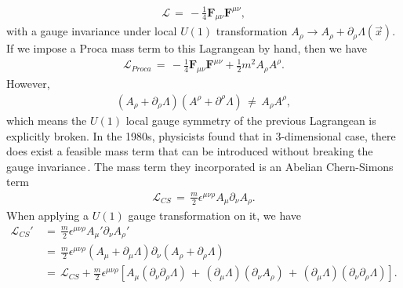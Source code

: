 \begin{equation}
    \begin{split}
        \mathcal{L}\,=\,-\frac{1}{4}\mathbf{F}_{\mu\nu}\mathbf{F}^{\mu\nu},
    \end{split}
\end{equation}
with a gauge invariance under local $U\left(1\right)$ transformation $A_{\rho}\rightarrow A_{\rho}+\partial_{\rho}\Lambda\left(\Vec{x}\right)$. If we impose a Proca mass term to this Lagrangean by hand, then we have
\begin{equation}
    \begin{split}
        \mathcal{L}_{Proca}\,=\,-\frac{1}{4}\mathbf{F}_{\mu\nu}\mathbf{F}^{\mu\nu}+\frac{1}{2}m^{2}A_{\rho}A^{\rho}.
    \end{split}
\end{equation}
However,
\begin{equation}
    \begin{split}
        \left(A_{\rho}+\partial_{\rho}\Lambda\right)\left(A^{\rho}+\partial^{\rho}\Lambda\right)\,\neq\,A_{\rho}A^{\rho},
    \end{split}
\end{equation}
which means the $U\left(1\right)$ local gauge symmetry of the previous Lagrangean is explicitly broken. In the 1980s, physicists found that in 3-dimensional case, there does exist a feasible mass term that can be introduced without breaking the gauge invariance\,\cite{deser1982three}. The mass term they incorporated is an Abelian Chern-Simons term
\begin{equation}\label{Chern-Simons mass term}
    \begin{split}
        \mathcal{L}_{CS}\,=\,\frac{m}{2}\epsilon^{\mu\nu\rho}A_{\mu}\partial_{\nu}A_{\rho}.
    \end{split}
\end{equation}
When applying a $U\left(1\right)$ gauge transformation on it, we have
\begin{equation}\label{Prove gauge invariance of Chern-Simons term}
    \begin{split}
        \mathcal{L}_{CS}'\,&=\,\frac{m}{2}\epsilon^{\mu\nu\rho}A_{\mu}'\partial_{\nu}A_{\rho}' \\
        &=\,\frac{m}{2}\epsilon^{\mu\nu\rho}\left(A_{\mu}+\partial_{\mu}\Lambda\right)\partial_{\nu}\left(A_{\rho}+\partial_{\rho}\Lambda\right) \\
        &=\,\mathcal{L}_{CS}+\frac{m}{2}\epsilon^{\mu\nu\rho}\left[A_{\mu}\left(\partial_{\nu}\partial_{\rho}\Lambda\right)\,+\,\left(\partial_{\mu}\Lambda\right)\left(\partial_{\nu}A_{\rho}\right)\,+\,\left(\partial_{\mu}\Lambda\right)\left(\partial_{\nu}\partial_{\rho}\Lambda\right)\right].
    \end{split}
\end{equation}
